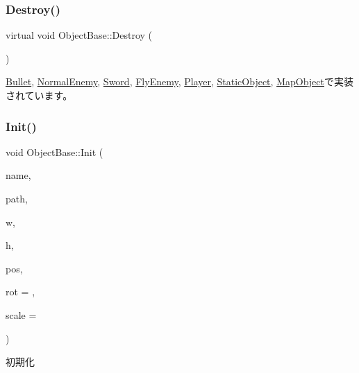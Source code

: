 \subsubsection{\texorpdfstring{Destroy()}{Destroy()}}
{\footnotesize\ttfamily virtual void Object\+Base\+::\+Destroy (\begin{DoxyParamCaption}{ }\end{DoxyParamCaption})\hspace{0.3cm}{\ttfamily [pure virtual]}}



\mbox{\hyperlink{class_bullet_a09a92c6b924fb6bc38e18f6c41ac20ff}{Bullet}}, \mbox{\hyperlink{class_normal_enemy_a8a4271b6da6c7679d134d1c08125815b}{Normal\+Enemy}}, \mbox{\hyperlink{class_sword_a8473b694775374df4d9b6305cfa82293}{Sword}}, \mbox{\hyperlink{class_fly_enemy_af7ce5137e8eb2e8cc6654fbbdbc714cd}{Fly\+Enemy}}, \mbox{\hyperlink{class_player_af2cf4936165ef12cce96f7994e0879df}{Player}}, \mbox{\hyperlink{class_static_object_a8e9fb321b4f8f12c4bec1bc66853512f}{Static\+Object}}, \mbox{\hyperlink{class_map_object_ad4bcfdc33bd945a9aa5e50a57c2704bc}{Map\+Object}}で実装されています。

\mbox{\label{class_object_base_a65028dd02e59f53f441e3dcccaf301e9}} 
\subsubsection{\texorpdfstring{Init()}{Init()}}
{\footnotesize\ttfamily void Object\+Base\+::\+Init (\begin{DoxyParamCaption}\item[{std\+::string}]{name,  }\item[{W\+C\+H\+AR $\ast$}]{path,  }\item[{const L\+O\+NG}]{w,  }\item[{const L\+O\+NG}]{h,  }\item[{\mbox{\hyperlink{common_8h_afb0c5e21d4133ff4f200992c0b534e1b}{V\+E\+C2}}}]{pos,  }\item[{float}]{rot = {},  }\item[{float}]{scale = {} }\end{DoxyParamCaption})}



初期化 



